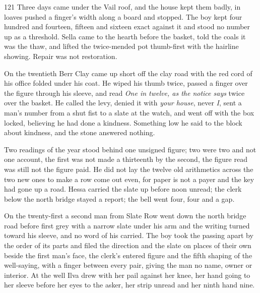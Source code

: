 
\scenebreak


\scenebreak


\scenebreak

\CRtailpiece
\begin{CRchronicle}{121}
Three days came under the Vail roof, and the house kept them badly, in loaves pushed a finger’s width along a board and stopped. The boy kept four hundred and fourteen, fifteen and sixteen exact against it and stood no number up as a threshold. Sella came to the hearth before the basket, told the coals it was the thaw, and lifted the twice-mended pot thumb-first with the hairline showing. Repair was not restoration.

On the twentieth Berr Clay came up short off the clay road with the red cord of his office folded under his coat. He wiped his thumb twice, passed a finger over the figure through his sleeve, and read \emph{One in twelve, as the notice says} twice over the basket. He called the levy, denied it with \emph{your house}, never \emph{I}, sent a man’s number from a shut fist to a slate at the watch, and went off with the box locked, believing he had done a kindness. Something low he said to the block about kindness, and the stone answered nothing.

Two readings of the year stood behind one unsigned figure; two were two and not one account, the first was not made a thirteenth by the second, the figure read was still not the figure paid. He did not lay the twelve old arithmetics across the two new ones to make a row come out even, for paper is not a payer and the key had gone up a road. Hessa carried the slate up before noon unread; the clerk below the north bridge stayed a report; the bell went four, four and a gap.

On the twenty-first a second man from Slate Row went down the north bridge road before first grey with a narrow slate under his arm and the writing turned toward his sleeve, and no word of his carried. The boy took the passing apart by the order of its parts and filed the direction and the slate on places of their own beside the first man’s face, the clerk’s entered figure and the fifth shaping of the well-saying, with a finger between every pair, giving the man no name, owner or interior. At the well Ilva drew with her pail against her knee, her hand going to her sleeve before her eyes to the asker, her strip unread and her ninth hand nine.


\end{CRchronicle}
